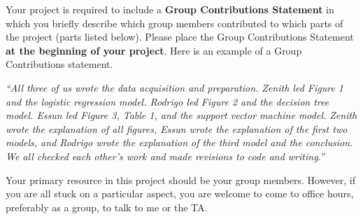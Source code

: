 \documentclass[12pt]{article}
\begin{document}
Your project is required to include a {\bf Group Contributions Statement} in which you briefly describe which group members contributed to which parts of the project (parts listed below). Please place the Group Contributions Statement {\bf at the beginning of your project}. Here is an example of a Group Contributions statement.

{\it “All three of us wrote the data acquisition and preparation. Zenith led Figure 1 and the logistic regression model. Rodrigo led Figure 2 and the decision tree model. Essun led Figure 3, Table 1, and the support vector machine model. Zenith wrote the explanation of all figures, Essun wrote the explanation of the first two models, and Rodrigo wrote the explanation of the third model and the conclusion. We all checked each other’s work and made revisions to code and writing.”}

Your primary resource in this project should be your group members. However, if you are all stuck on a particular aspect, you are welcome to come to office hours, preferably as a group, to talk to me or the TA.
\end{document}
